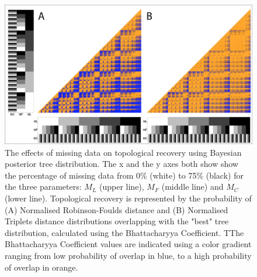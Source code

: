 \begin{figure} 
\centering
    \includegraphics[width=1\textwidth]{SupplementaryFigures/PairwiseComp-Bayt-RF+Tr-colour.png} %
    \caption{The effects of missing data on topological recovery using Bayesian posterior tree distribution. The x and the y axes both show show the percentage of missing data from 0\% (white) to 75\% (black) for the three parameters: $M_{L}$ (upper line), $M_{F}$ (middle line) and $M_{C}$ (lower line). Topological recovery is represented by the probability of (A) Normalised Robinson-Foulds distance and (B) Normalised Triplets distance distributions overlapping with the "best" tree distribution, calculated using the Bhattacharyya Coefficient. TThe Bhattacharyya Coefficient values are indicated using a color gradient ranging from low probability of overlap in blue, to a high probability of overlap in orange.}
\label{Fig_Supp_paircomp_Bayt}
\end{figure} 



